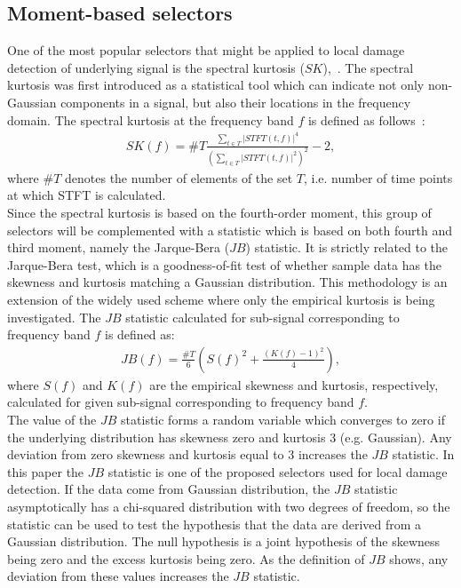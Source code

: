 \documentclass[3p,times]{elsarticle}
\begin{document}
\subsection{Moment-based selectors}
One of the most popular selectors that might be applied to local damage detection of underlying signal is the spectral kurtosis ($SK$),~\cite{bib23}. The spectral kurtosis  was first introduced as a statistical tool which can indicate not only non-Gaussian components in a signal, but also their locations in the frequency domain. The spectral kurtosis at the frequency band $f$ is defined as follows~\cite{bib23}:
\begin{eqnarray}\label{spectral_kurtosis}
SK(f)=\#T\frac{\sum_{t\in T}|STFT(t,f)|^4}{(\sum_{t\in T}|STFT(t,f)|^2)^2}-2,
\end{eqnarray}
where $\#T$ denotes the number of elements of the set $T$, i.e. number of time points at which STFT is calculated.\\
Since the spectral kurtosis is based on the fourth-order moment, this group of selectors will be complemented with a statistic which is based on both fourth and third moment, namely the Jarque-Bera ($JB$) statistic. It is strictly related to the Jarque-Bera test, which is a goodness-of-fit test of whether sample data has the skewness and kurtosis matching a Gaussian distribution. This methodology is an extension of the  widely used scheme where only the empirical kurtosis is being investigated. The $JB$ statistic calculated for sub-signal corresponding to frequency band $f$ is defined as:
\begin{eqnarray}
JB(f)=\frac{\#T}{6}\left(S(f)^2+\frac{\left(K(f)-1\right)^2}{4}\right),
\end{eqnarray}
where $S(f)$ and $K(f)$ are the empirical skewness and kurtosis, respectively, calculated for given sub-signal corresponding to frequency band $f$.\\
The value of the $JB$ statistic forms a random variable which converges to zero if the underlying distribution has skewness zero and kurtosis 3 (e.g. Gaussian). Any deviation from zero skewness and kurtosis equal to 3 increases the $JB$ statistic.  In this paper the $JB$ statistic is one of the proposed selectors used for local damage detection. If the data come from Gaussian distribution, the $JB$ statistic asymptotically has a chi-squared distribution with two degrees of freedom, so the statistic can be used to test the hypothesis that the data are derived from a Gaussian distribution. The null hypothesis is a joint hypothesis of the skewness being zero and the excess kurtosis being zero. As the definition of $JB$ shows, any deviation from these values increases the $JB$ statistic.\\
\end{document}
